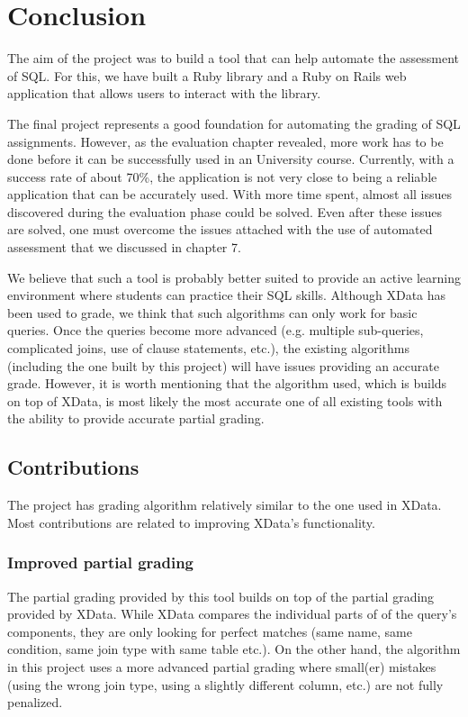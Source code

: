 \chapter{Conclusion}

The aim of the project was to build a tool that can help automate the assessment of SQL. For this, we have built a Ruby library and a Ruby on Rails web application that allows users to interact with the library. 

The final project represents a good foundation for automating the grading of SQL assignments.  However, as the evaluation chapter revealed, more work has to be done before it can be successfully used in an University course. Currently, with a success rate of about 70\%, the application is not very close to being a reliable application that can be accurately used. With more time spent, almost all issues discovered during the evaluation phase could be solved. Even after these issues are solved, one must overcome the issues attached with the use of automated assessment that we discussed in chapter 7.

We believe that such a tool is probably better suited to provide an active learning environment where students can practice their SQL skills. Although XData has been used to grade, we think that such algorithms can only work for basic queries. Once the queries become more advanced (e.g. multiple sub-queries, complicated joins, use of clause statements, etc.), the existing algorithms (including the one built by this project) will have issues providing an accurate grade. However, it is worth mentioning that the algorithm used, which is builds on top of XData, is most likely the most accurate one of all existing tools with the ability to provide accurate partial grading.

\section{Contributions}
The project has grading algorithm relatively similar to the one used in XData. Most contributions are related to improving XData's functionality.

\subsection{Improved partial grading}
The partial grading provided by this tool builds on top of the partial grading provided by XData. While XData compares the individual parts of of the query's components, they are only looking for perfect matches (same name, same condition, same join type with same table etc.). On the other hand, the algorithm in this project uses a more advanced partial grading where small(er) mistakes (using the wrong join type, using a slightly different column, etc.) are not fully penalized. 

